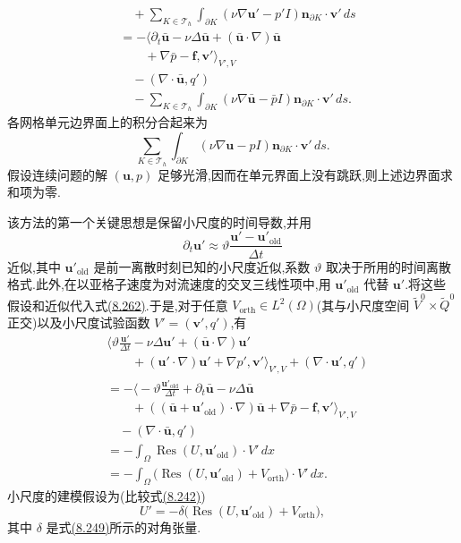 \begin{note}[主要思路与方法推导]
\begin{equation}
\begin{aligned}
 &\quad+\sum_{K\in\mathcal T_h}\int_{\partial K}
       (\nu\nabla\bm u'-p'I)
       \bm n_{\partial K}\cdot\bm v'\,ds\\
 &=-\bigl\langle\partial_t\bar{\bm u}-\nu\Delta\bar{\bm u}
     +(\bar{\bm u}\cdot\nabla)\bar{\bm u}\\
 &\qquad+\nabla\bar p-\bm f,\bm v'\bigr\rangle_{V',V}\\
 &\quad-(\nabla\cdot\bar{\bm u},q')\\
 &\quad-\sum_{K\in\mathcal T_h}\int_{\partial K}
       (\nu\nabla\bar{\bm u}-\bar p I)
       \bm n_{\partial K}\cdot\bm v'\,ds.
\end{aligned}
\end{equation}
各网格单元边界面上的积分合起来为
\[
 \sum_{K\in\mathcal T_h}\int_{\partial K}
   (\nu\nabla\bm u-pI)\bm n_{\partial K}\cdot\bm v'\,ds.
\]
假设连续问题的解 $(\bm u,p)$ 足够光滑,因而在单元界面上没有跳跃,则上述边界面求和项为零.

该方法的第一个关键思想是保留小尺度的时间导数,并用
\[
 \partial_t\bm u'\approx
 \vartheta\frac{\bm u'-\bm u'_{\mathrm{old}}}{\Delta t}
\]
近似,其中 $\bm u'_{\mathrm{old}}$ 是前一离散时刻已知的小尺度近似,系数 $\vartheta$ 取决于所用的时间离散格式.此外,在以亚格子速度为对流速度的交叉三线性项中,用 $\bm u'_{\mathrm{old}}$ 代替 $\bm u'$.将这些假设和近似代入式\hyperref[eq:vms-oss-small-scale-integration-by-parts]{(8.262)}.于是,对于任意 $V_{\mathrm{orth}}\in L^2(\Omega)$(其与小尺度空间 $\widetilde V^0\times\widetilde Q^0$ 正交)以及小尺度试验函数 $V'=(\bm v',q')$,有
\begin{equation}\label{eq:vms-oss-time-dependent-residual-equation}
\begin{aligned}
 &\bigl\langle\vartheta\frac{\bm u'}{\Delta t}
   -\nu\Delta\bm u'
   +(\bar{\bm u}\cdot\nabla)\bm u'\\
 &\qquad+(\bm u'\cdot\nabla)\bm u'+\nabla p',
   \bm v'\bigr\rangle_{V',V}
   +(\nabla\cdot\bm u',q')\\
 &=-\bigl\langle-\vartheta\frac{\bm u'_{\mathrm{old}}}{\Delta t}
   +\partial_t\bar{\bm u}-\nu\Delta\bar{\bm u}\\
 &\qquad+((\bar{\bm u}+\bm u'_{\mathrm{old}})\cdot\nabla)\bar{\bm u}
   +\nabla\bar p-\bm f,\bm v'\bigr\rangle_{V',V}\\
 &\quad-(\nabla\cdot\bar{\bm u},q')\\
 &=-\int_\Omega\operatorname{Res}(U,\bm u'_{\mathrm{old}})\cdot V'\,dx\\
 &=-\int_\Omega\bigl(\operatorname{Res}(U,\bm u'_{\mathrm{old}})
       +V_{\mathrm{orth}}\bigr)\cdot V'\,dx.
\end{aligned}
\end{equation}
小尺度的建模假设为(比较式\hyperref[eq:vms-two-scale-unresolved-history-operator]{(8.242)})
\begin{equation}\label{eq:vms-oss-subscale-ansatz}
 U'=-\delta\bigl(\operatorname{Res}(U,\bm u'_{\mathrm{old}})+V_{\mathrm{orth}}\bigr),
\end{equation}
其中 $\delta$ 是式\hyperref[eq:vms-residual-parameter-tensor]{(8.249)}所示的对角张量.


\end{note}
